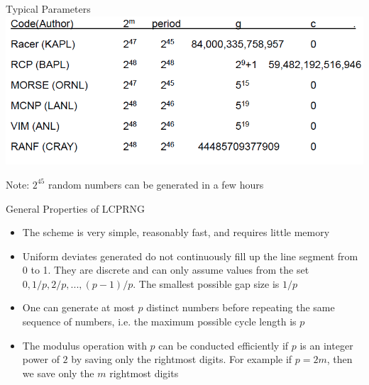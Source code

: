 \documentclass[xcolor=x11names,compress]{beamer}
\renewcommand{\(}{\begin{columns}}
\renewcommand{\)}{\end{columns}}
\newcommand{\<}[1]{\begin{column}{#1}}
\renewcommand{\>}{\end{column}}
\begin{document}
\begin{frame}{Typical Parameters}
\includegraphics[scale=0.4]{../figs/rng2}

Note: $2^{45}$ random numbers can be generated in a few hours
\end{frame}

\begin{frame}{General Properties of LCPRNG}
\begin{itemize}
\item The scheme is very simple, reasonably fast, and requires little memory
\item Uniform deviates generated do not continuously fill up the line segment from 0 to 1. They are discrete and can only assume values from the set $0, 1/p, 2/p,...,(p-1)/p$. The smallest possible gap size is $1/p$
\item One can generate at most $p$ distinct numbers before repeating the same sequence of numbers, i.e. the maximum possible cycle length is $p$
\item The modulus operation with $p$ can be conducted efficiently if $p$ is an integer power of $2$ by saving only the rightmost digits. For example if $p = 2m$, then we save only the $m$ rightmost digits
\end{itemize}  	
\end{frame}
\end{document}
